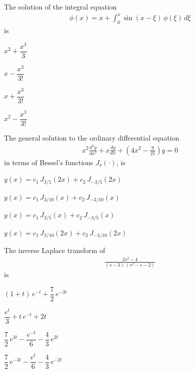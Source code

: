 \documentclass[journal,12pt,onecolumn]{IEEEtran}
\theoremstyle{remark}
\begin{document}
\begin{enumerate}
{\hfill{}

\item The solution of the integral equation
\begin{align*}
\phi(x)=x+\int_{0}^{x}\sin(x-\xi)\,\phi(\xi)\,d\xi
\end{align*}
is
\hfill{}

\begin{enumerate}
\begin{multicols}{4}
\item $x^{2}+\dfrac{x^{3}}{3}$
\item $x-\dfrac{x^{3}}{3!}$
\item $x+\dfrac{x^{3}}{3!}$
\item $x^{2}-\dfrac{x^{3}}{3!}$
\end{multicols}
\end{enumerate}
\newpage

\item The general solution to the ordinary differential equation
\begin{align*}
x^{2}\frac{d^{2}y}{dx^{2}}+x\frac{dy}{dx}+\left(4x^{2}-\frac{9}{25}\right)y=0
\end{align*}
in terms of Bessel's functions $J_\nu(\cdot)$, is
\nolinebreak

\hfill\mbox{}

\begin{enumerate}
\begin{multicols}{2}
\item $y(x)=c_{1}\,J_{3/5}(2x)+c_{2}\,J_{-3/5}(2x)$
\item $y(x)=c_{1}\,J_{3/10}(x)+c_{2}\,J_{-3/10}(x)$
\item $y(x)=c_{1}\,J_{3/5}(x)+c_{2}\,J_{-3/5}(x)$
\item $y(x)=c_{1}\,J_{3/10}(2x)+c_{2}\,J_{-3/10}(2x)$
\end{multicols}
\end{enumerate}

\item The inverse Laplace transform of
\begin{align*}
\frac{2s^{2}-4}{(s-3)\,(s^{2}-s-2)}
\end{align*}
is

\begin{enumerate}
\begin{multicols}{2}
\item $(1+t)\,e^{-t}+\dfrac{7}{2}\,e^{-3t}$
\item \(\dfrac{e^{t}}{3}+t\,e^{-t}+2t\)
\item \(\dfrac{7}{2}\,e^{3t}-\dfrac{e^{-t}}{6}-\dfrac{4}{3}\,e^{2t}\)
\item \(\dfrac{7}{2}\,e^{-3t}-\dfrac{e^{t}}{6}-\dfrac{4}{3}\,e^{-2t}\)
\end{multicols}
\end{enumerate}


}
\end{enumerate}
\end{document}

